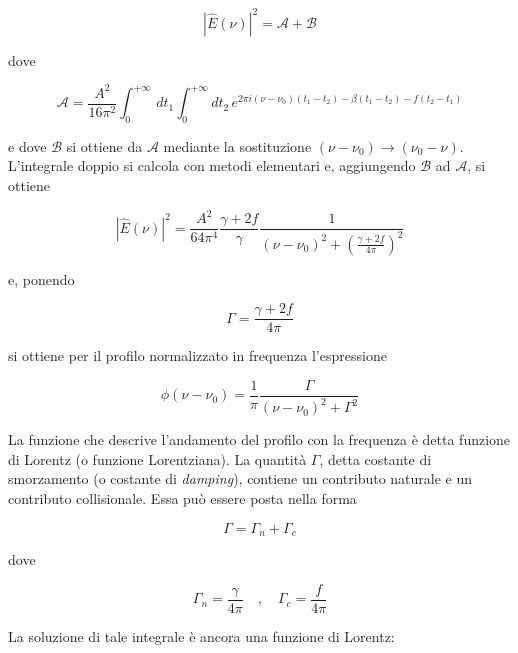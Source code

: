 \begin{equation*}
  |\hat{E}(\nu)|^2=\mathcal{A} + \mathcal{B}
\end{equation*}

dove 

\begin{equation*}
  \mathcal{A}=\frac{A^2}{16 \pi^2}\int_{0}^{+\infty}\, dt_1 \int_{0}^{+\infty} dt_2\, e^{2\pi i(\nu-\nu_0)(t_1-t_2)-\beta (t_1-t_2)-f(t_2 - t_1)}
\end{equation*}

e dove $\mathcal{B}$ si ottiene da $\mathcal{A}$ mediante la sostituzione $(\nu - \nu_0) \to (\nu_0 - \nu)$. L'integrale doppio si calcola con metodi elementari e, aggiungendo $\mathcal{B}$ ad $\mathcal{A}$, si ottiene

\begin{equation*}
  |\hat{E}(\nu)|^2=\frac{A^2}{64 \pi^4} \frac{\gamma + 2f}{\gamma} \frac{1}{(\nu - \nu_0)^2 + \left( \frac{\gamma + 2f}{4 \pi} \right)^2}
\end{equation*}

e, ponendo

\begin{equation*}
  \Gamma=\frac{\gamma + 2f}{4 \pi}
\end{equation*}

si ottiene per il profilo normalizzato in frequenza l'espressione

\begin{equation*}
  \phi(\nu - \nu_0)=\frac{1}{\pi} \frac{\Gamma}{(\nu - \nu_0)^2 + \Gamma^2}
\end{equation*}

La funzione che descrive l'andamento del profilo con la frequenza è detta funzione di Lorentz (o funzione Lorentziana). La quantità $\Gamma$, detta costante di
smorzamento (o costante di \textit{damping}), contiene un contributo naturale e un contributo collisionale. Essa può essere posta nella forma

\begin{equation*}
  \Gamma=\Gamma_n + \Gamma_c
\end{equation*}

dove

\begin{equation*}
  \Gamma_n=\frac{\gamma}{4 \pi}
  \quad,\quad
  \Gamma_c=\frac{f}{4 \pi}
\end{equation*}

\hrulefill

La soluzione di tale integrale è ancora una funzione di Lorentz:

